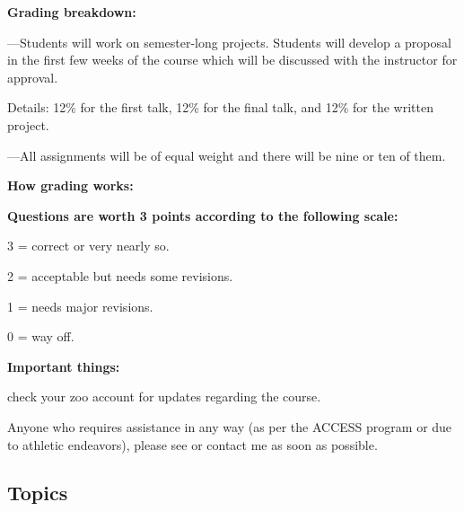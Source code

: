   \textbf{Grading breakdown:}

  
    
     
      ---Students will 
      work on semester-long projects.  Students will develop a
      proposal in the first few weeks of the course which will be discussed
      with the instructor for approval.  

      \smallskip

      Details: 12\% for the first talk, 12\% for the final talk,
      and 12\% for the written project.
    
  
  
    
     
      ---All assignments will be 
      of equal weight and there will be nine or ten of them.
    
  
  
    
     
    
  


  \textbf{How grading works:}

  \textbf{Questions are worth 3 points according to the following scale:}
    
     
      3 = correct or very nearly so.
     
      2 = acceptable but needs some revisions.
     
      1 = needs major revisions.
     
      0 = way off.
    

  




  \textbf{Important things:}

  
    \importantdates
  

  
     check your zoo account for updates regarding the course.
  

  
     Anyone who requires assistance in any way 
    (as per the ACCESS program
    or due to athletic endeavors), please see or contact me as soon as possible.
  



\subsection{Topics}


